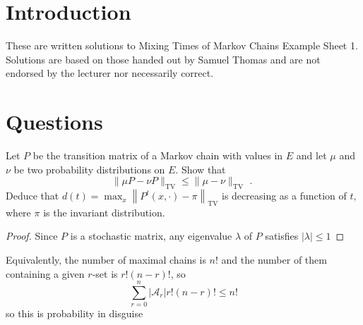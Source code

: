 \documentclass[a4paper]{article}
\begin{document}
	
	
	\section{Introduction}
	These are written solutions to Mixing Times of Markov Chains Example Sheet 1. Solutions are based on those handed out by Samuel Thomas and are not endorsed by the lecturer nor necessarily correct.
	\section{Questions}
	
	\begin{question}[Question 1]
	Let \(P\) be the transition matrix of a Markov chain with values in \(E\) and let \(\mu\) and \(\nu\) be two
	probability distributions on \(E .\) Show that
$$
\|\mu P-\nu P\|_{\mathrm{TV}} \leq\|\mu-\nu\|_{\mathrm{TV}} \text { . }
$$
Deduce that \(d(t)=\max _{x}\left\|P^{t}(x, \cdot)-\pi\right\|_{\mathrm{TV}}\) is decreasing as a function of \(t,\) where \(\pi\) is the invariant
distribution.
	\end{question}
	
	\begin{proof}
		Since $P$ is a stochastic matrix, any eigenvalue $\lambda$ of $P$ satisfies $|\lambda| \leq 1$
	\end{proof}
	
	\begin{remark}
		Equivalently, the number of maximal chains is \(n!\) and the number of them containing a given \(r\)-set is \(r! (n - r)!\), so
		\[
		\sum_{r = 0}^n |\mathcal A_r| r! (n - r)! \leq n!
		\]
		so this is probability in disguise
	\end{remark}
	
\end{document}
